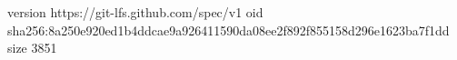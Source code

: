 version https://git-lfs.github.com/spec/v1
oid sha256:8a250e920ed1b4ddcae9a926411590da08ee2f892f855158d296e1623ba7f1dd
size 3851
